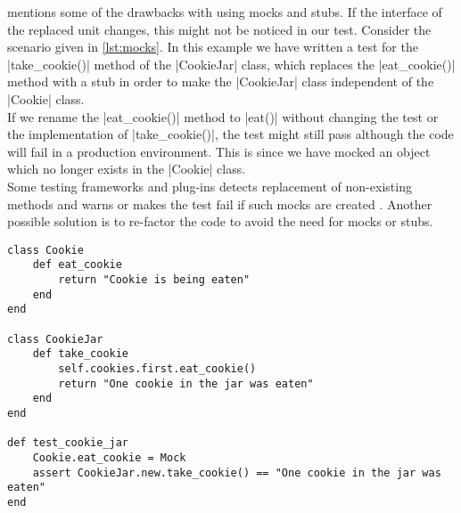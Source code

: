 \citet{video:boundaries} mentions some of the drawbacks with using mocks
and stubs. If the interface of the replaced unit changes, this might not
be noticed in our test. Consider the scenario given in \ref{lst:mocks}.
In this example we have written a test for the |take_cookie()| method of
the |CookieJar| class, which replaces the |eat_cookie()| method with a
stub in order to make the |CookieJar| class independent of the |Cookie|
class.\\

If we rename the |eat_cookie()| method to |eat()| without changing the
test or the implementation of |take_cookie()|, the test might still pass
although the code will fail in a production environment. This is since
we have mocked an object which no longer exists in the |Cookie| class.\\

Some testing frameworks and plug-ins detects replacement of non-existing
methods and warns or makes the test fail if such mocks are created
\cite{video:boundaries}. Another possible solution is to re-factor the
code to avoid the need for mocks or stubs.\\

\begin{lstlisting}[caption=Example of how mocking might make tests unaware
                           of changes which breaks functionality,
                   label=lst:mocks, float=t]
class Cookie
    def eat_cookie
        return "Cookie is being eaten"
    end
end

class CookieJar
    def take_cookie
        self.cookies.first.eat_cookie()
        return "One cookie in the jar was eaten"
    end
end

def test_cookie_jar
    Cookie.eat_cookie = Mock
    assert CookieJar.new.take_cookie() == "One cookie in the jar was eaten"
end
\end{lstlisting}
